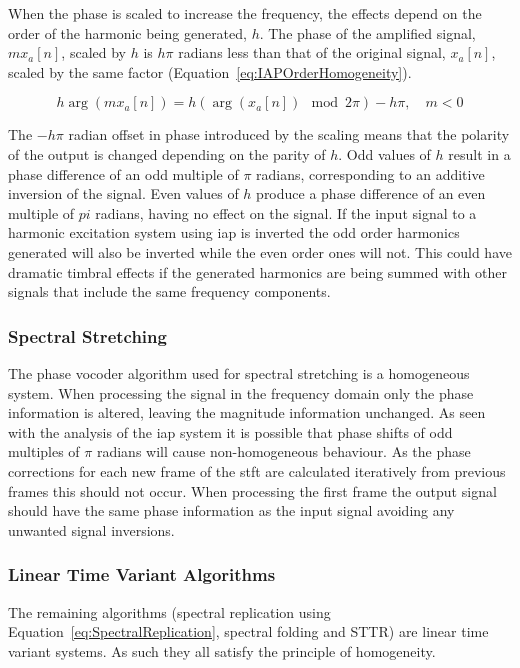			When the phase is scaled to increase the frequency, the effects depend on the order of the harmonic
			being generated, $h$. The phase of the amplified signal, $mx_{a}[n]$, scaled by $h$ is $h\pi$
			radians less than that of the original signal, $x_{a}[n]$, scaled by the same factor
			(Equation~\ref{eq:IAPOrderHomogeneity}).

			\begin{equation}
				h\arg(mx_{a}[n]) = h(\arg(x_{a}[n]) \mod 2\pi) - h\pi, \quad m < 0
				\label{eq:IAPOrderHomogeneity}
			\end{equation}

			The $-h\pi$ radian offset in phase introduced by the scaling means that the polarity of the output
			is changed depending on the parity of $h$. Odd values of $h$ result in a phase difference of an odd
			multiple of $\pi$ radians, corresponding to an additive inversion of the signal. Even values of $h$
			produce a phase difference of an even multiple of $pi$ radians, having no effect on the signal. If
			the input signal to a harmonic excitation system using \acrshort{iap} is inverted the odd order
			harmonics generated will also be inverted while the even order ones will not. This could have
			dramatic timbral effects if the generated harmonics are being summed with other signals that
			include the same frequency components.

		\subsubsection*{Spectral Stretching}
			The phase vocoder algorithm used for spectral stretching is a homogeneous system. When processing
			the signal in the frequency domain only the phase information is altered, leaving the magnitude
			information unchanged. As seen with the analysis of the \acrshort{iap} system it is possible that
			phase shifts of odd multiples of $\pi$ radians will cause non-homogeneous behaviour. As the phase
			corrections for each new frame of the \acrshort{stft} are calculated iteratively from previous
			frames this should not occur. When processing the first frame the output signal should have the
			same phase information as the input signal avoiding any unwanted signal inversions.

		\subsubsection*{Linear Time Variant Algorithms}
			The remaining algorithms (spectral replication using Equation~\ref{eq:SpectralReplication},
			spectral folding and STTR) are linear time variant systems. As such they all satisfy the principle
			of homogeneity.

